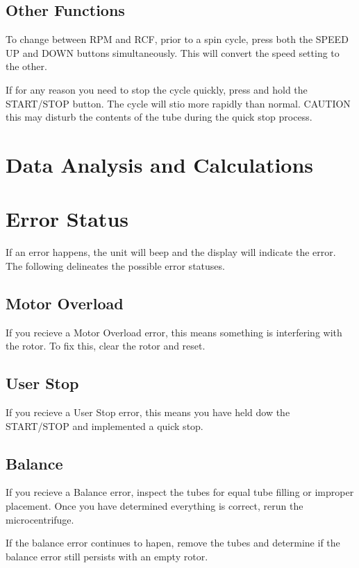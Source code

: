 \documentclass[12pt]{../SOP3_beta}
\begin{document}
\subsection*{Other Functions}

\NP To change between RPM and RCF, prior to a spin cycle, press both the SPEED UP and DOWN buttons simultaneously. This will convert the speed setting to the other.

\NP If for any reason you need to stop the cycle quickly, press and hold the START/STOP button. The cycle will stio more rapidly than normal. CAUTION this may disturb the contents of the tube during the quick stop process.  

\section{Data Analysis and Calculations}

\section{Error Status}

\NP If an error happens, the unit will beep and the display will indicate the error. The following delineates the possible error statuses. 

\subsection*{Motor Overload}

\NP If you recieve a Motor Overload error, this means something is interfering with the rotor. To fix this, clear the rotor and reset. 

\subsection*{User Stop}

\NP If you recieve a User Stop error, this means you have held dow the START/STOP and implemented a quick stop.

\subsection*{Balance}

\NP If you recieve a Balance error, inspect the tubes for equal tube filling or improper placement. Once you have determined everything is correct, rerun the microcentrifuge. 

\NP If the balance error continues to hapen, remove the tubes and determine if the balance error still persists with an empty rotor.
\end{document}
